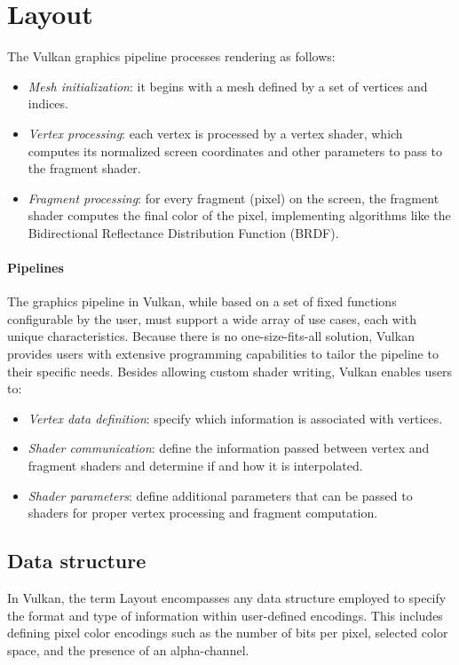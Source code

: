 \section{Layout}

The Vulkan graphics pipeline processes rendering as follows:
\begin{itemize}
    \item \textit{Mesh initialization}: it begins with a mesh defined by a set of vertices and indices.
    \item \textit{Vertex processing}: each vertex is processed by a vertex shader, which computes its normalized screen coordinates and other parameters to pass to the fragment shader.
    \item \textit{Fragment processing}: for every fragment (pixel) on the screen, the fragment shader computes the final color of the pixel, implementing algorithms like the Bidirectional Reflectance Distribution Function (BRDF).
\end{itemize}

\paragraph*{Pipelines}
The graphics pipeline in Vulkan, while based on a set of fixed functions configurable by the user, must support a wide array of use cases, each with unique characteristics. 
Because there is no one-size-fits-all solution, Vulkan provides users with extensive programming capabilities to tailor the pipeline to their specific needs.
Besides allowing custom shader writing, Vulkan enables users to:
\begin{itemize}
    \item \textit{Vertex data definition}: specify which information is associated with vertices.
    \item \textit{Shader communication}: define the information passed between vertex and fragment shaders and determine if and how it is interpolated.
    \item \textit{Shader parameters}: define additional parameters that can be passed to shaders for proper vertex processing and fragment computation.
\end{itemize}

\subsection{Data structure}
In Vulkan, the term Layout encompasses any data structure employed to specify the format and type of information within user-defined encodings. 
This includes defining pixel color encodings such as the number of bits per pixel, selected color space, and the presence of an alpha-channel.

